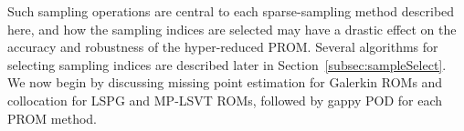 Such sampling operations are central to each sparse-sampling method described here, and how the sampling indices are selected may have a drastic effect on the accuracy and robustness of the hyper-reduced PROM. Several algorithms for selecting sampling indices are described later in Section~\ref{subsec:sampleSelect}. We now begin by discussing missing point estimation for Galerkin ROMs and collocation for LSPG and MP-LSVT ROMs, followed by gappy POD for each PROM method.